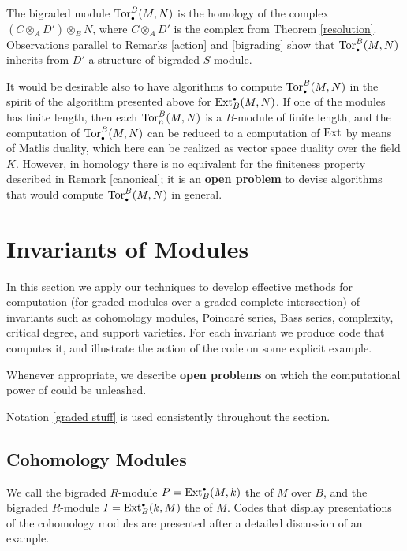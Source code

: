 \begin{Remark}
The bigraded module $\operatorname{Tor}_{\scriptscriptstyle\bullet}^B(M,N)$ is the homology of the complex
$(C \otimes_A D') \otimes_B N$, where $C\otimes_A D'$ is the complex
from Theorem \ref{resolution}.  Observations parallel to Remarks
\ref{action} and \ref{bigrading} show that $\operatorname{Tor}_{\scriptscriptstyle\bullet}^B(M,N)$ inherits
from $D'$ a structure of bigraded $S$-module.

It would be desirable also to have algorithms to compute
$\operatorname{Tor}_{\scriptscriptstyle\bullet}^B(M,N)$ in the spirit of the algorithm presented above for
$\operatorname{Ext}^{\scriptscriptstyle\bullet}_B(M,N)$.  If one of the modules has finite length, then
each $\operatorname{Tor}_n^B(M,N)$ is a $B$-module of finite length, and the
computation of $\operatorname{Tor}_{\scriptscriptstyle\bullet}^B(M,N)$ can be reduced to a computation of
$\operatorname{Ext}$ by means of Matlis duality, which here can be realized as vector
space duality over the field $K$.  However, in homology there is no
equivalent for the finiteness property described in Remark
\ref{canonical}; it is an {\bf open problem} to devise algorithms that
would compute $\operatorname{Tor}_{\scriptscriptstyle\bullet}^B(M,N)$ in general.
 \end{Remark}

\section{Invariants of Modules}
\label{Invariants of modules}

In this section we apply our techniques to develop effective methods
for computation (for graded modules over a graded complete
intersection) of invariants such as cohomology modules, Poincar\'e
series, Bass series, complexity, critical degree, and support
varieties.  For each invariant we produce code that computes it, and
illustrate the action of the code on some explicit example.

Whenever appropriate, we describe {\bf open problems} on which the
computational power of \Mtwo could be unleashed.

Notation \ref{graded stuff} is used consistently throughout the section.

\subsection{Cohomology Modules}
\label{Computation of cohomology}

We call the bigraded $R$-module $P=\operatorname{Ext}^{\scriptscriptstyle\bullet}_B(M,k)$ the
{\it{}\/} of $M$ over $B$, and the
bigraded $R$-module $I=\operatorname{Ext}^{\scriptscriptstyle\bullet}_B(k,M)$ the {\it{}\/} of $M$.   Codes that display presentations of the
cohomology modules are presented after a detailed discussion of an example.

